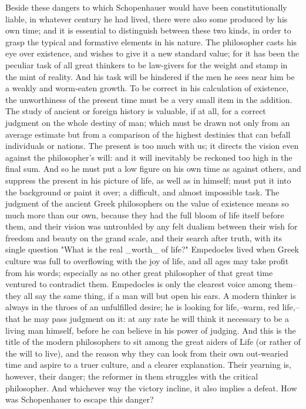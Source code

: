 Beside these dangers to which Schopenhauer would have been
constitutionally liable, in whatever century he had lived, there were
also some produced by his own time; and it is essential to
distinguish between these two kinds, in order to grasp the typical
and formative elements in his nature. The philosopher casts his eye
over existence, and wishes to give it a new standard value; for it
has been the peculiar task of all great thinkers to be law-givers for
the weight and stamp in the mint of reality. And his task will be
hindered if the men he sees near him be a weakly and worm-eaten
growth. To be correct in his calculation of existence, the
unworthiness of the present time must be a very small item in the
addition. The study of ancient or foreign history is valuable, if at
all, for a correct judgment on the whole destiny of man; which must
be drawn not only from an average estimate but from a comparison of
the highest destinies that can befall individuals or nations. The
present is too much with us; it directs the vision even against the
philosopher's will: and it will inevitably be reckoned too high in
the final sum. And so he must put a low figure on his own time as
against others, and suppress the present in his picture of life, as
well as in himself; must put it into the background or paint it over;
a difficult, and almost impossible task. The judgment of the ancient
Greek philosophers on the value of existence means so much more than
our own, because they had the full bloom of life itself before them,
and their vision was untroubled by any felt dualism between their
wish for freedom and beauty on the grand scale, and their search
after truth, with its single question "What is the real _worth_ of
life?" Empedocles lived when Greek culture was full to overflowing
with the joy of life, and all ages may take profit from his words;
especially as no other great philosopher of that great time ventured
to contradict them. Empedocles is only the clearest voice among
them--they all say the same thing, if a man will but open his ears. A
modern thinker is always in the throes of an unfulfilled desire; he
is looking for life,--warm, red life,--that he may pass judgment on
it: at any rate he will think it necessary to be a living man
himself, before he can believe in his power of judging. And this is
the title of the modern philosophers to sit among the great aiders of
Life (or rather of the will to live), and the reason why they can
look from their own out-wearied time and aspire to a truer culture,
and a clearer explanation. Their yearning is, however, their danger;
the reformer in them struggles with the critical philosopher. And
whichever way the victory incline, it also implies a defeat. How was
Schopenhauer to escape this danger?

